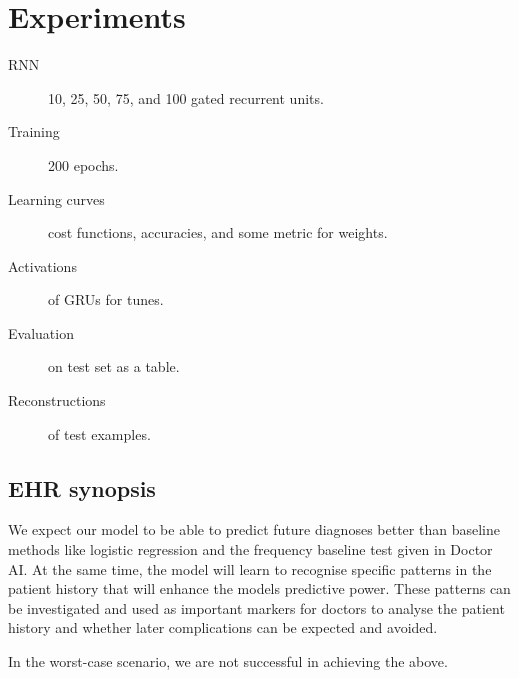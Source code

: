 \section{Experiments}
\label{sec:experiments}

\begin{description}
	\item [RNN] 10, 25, 50, 75, and 100 gated recurrent units.
	\item [Training] 200 epochs.
	\item [Learning curves] cost functions, accuracies, and some metric for weights.
	\item[Activations] of GRUs for tunes.
	\item[Evaluation] on test set as a table.
	\item [Reconstructions] of test examples.
\end{description}

\subsection*{EHR synopsis}

We expect our model to be able to predict future diagnoses better than baseline methods like logistic regression and the frequency baseline test given in Doctor AI. At the same time, the model will learn to recognise specific patterns in the patient history that will enhance the models predictive power. These patterns can be investigated and used as important markers for doctors to analyse the patient history and whether later complications can be expected and avoided.

In the worst-case scenario, we are not successful in achieving the above.
